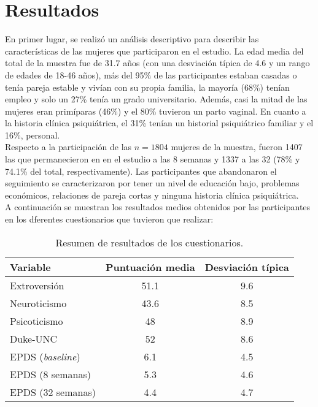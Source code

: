 \section{Resultados}\label{cap:resultados}

En primer lugar, se realizó un análisis descriptivo para describir las características de las mujeres que participaron en el estudio. La edad media del total de la muestra fue de 31.7 años (con una desviación típica de 4.6 y un rango de edades de 18-46 años), más del 95\% de las participantes estaban casadas o tenía pareja estable y vivían con su propia familia, la mayoría (68\%) tenían empleo y solo un 27\% tenía un grado universitario. Además, casi la mitad de las mujeres eran primíparas (46\%) y el 80\% tuvieron un parto vaginal. En cuanto a la historia clínica psiquiátrica, el 31\% tenían un historial psiquiátrico familiar y el 16\%, personal.\\

Respecto a la participación de las $n=1804$ mujeres de la muestra, fueron 1407 las que permanecieron en en el estudio a las 8 semanas y 1337 a las 32 (78\% y 74.1\% del total, respectivamente). Las participantes que abandonaron el seguimiento  se caracterizaron por tener un nivel de educación bajo, problemas económicos, relaciones de pareja cortas y ninguna historia clínica psiquiátrica. \\

A continuación se muestran los resultados medios obtenidos por las participantes en los dferentes cuestionarios que tuvieron que realizar:

\begin{table} [h!]
	\centering
	\label{tab:3}
	\begin{tabular}{l c c}
		\toprule
		\textbf{Variable} & Puntuación media & Desviación típica \\
		\midrule
		Extroversión  & 51.1   & 9.6 \\
		Neuroticismo&   43.6  & 8.5 \\
		Psicoticismo & 48  & 8.9 \\
		Duke-UNC  & 52   & 8.6 \\
		EPDS (\textit{baseline})&   6.1  & 4.5 \\
		EPDS (8 semanas) & 5.3  & 4.6 \\
		EPDS (32 semanas) & 4.4  & 4.7 \\
		\bottomrule
	\end{tabular}
	\caption{Resumen de resultados de los cuestionarios.}
\end{table}


